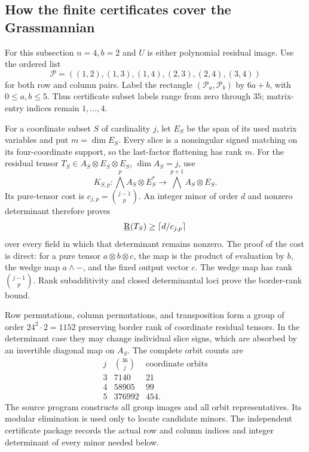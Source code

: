 
\subsection{How the finite certificates cover the Grassmannian}

For this subsection \(n=4,b=2\) and \(U\) is either polynomial
residual image. Use the ordered list
\[
 \mathcal P=((1,2),(1,3),(1,4),(2,3),(2,4),(3,4))
\]
for both row and column pairs. Label the rectangle
\((\mathcal P_a,\mathcal P_b)\) by \(6a+b\), with
\(0\leq a,b\leq5\). Thus certificate subset labels range from
zero through \(35\); matrix-entry indices remain \(1,\ldots,4\).

For a coordinate subset \(S\) of cardinality \(j\), let
\(E_S\) be the span of its used matrix variables and put
\(m= \dim E_S\). Every slice is a nonsingular signed matching
on its four-coordinate support, so the last-factor flattening
has rank \(m\). For the residual tensor
\(T_S\in A_S\otimes E_S\otimes E_S\), \(\dim A_S=j\), use
\[
 K_{S,p}:\bigwedge^p A_S\otimes E_S^*
 \longrightarrow \bigwedge^{p+1}A_S\otimes E_S.
\]
Its pure-tensor cost is \(c_{j,p}=\binom{j-1}{p}\).
An integer minor of order \(d\) and nonzero determinant
therefore proves
\[
 \underline{\mathrm R}(T_S)\geq \left\lceil d/c_{j,p}\right\rceil
\]
over every field in which that determinant remains nonzero.
The proof of the cost is direct: for a pure tensor
\(a\otimes b\otimes c\), the map is the product of evaluation
by \(b\), the wedge map \(a\wedge-\), and the fixed output
vector \(c\). The wedge map has rank \(\binom{j-1}{p}\).
Rank subadditivity and closed determinantal loci prove the
border-rank bound.

Row permutations, column permutations, and transposition form
a group of order \(24^2\cdot2=1152\) preserving border rank
of coordinate residual tensors. In the determinant case they
may change individual slice signs, which are absorbed by
an invertible diagonal map on \(A_S\).
The complete orbit counts are
\[
 \begin{array}{c|r|r}
 j&\binom{36}{j}&\text{coordinate orbits}\\ \hline
 3&7140&21\\
 4&58905&99\\
 5&376992&454.
 \end{array}
\]
The source program  constructs
all group images and all orbit representatives. Its modular
elimination is used only to locate candidate minors.
The independent certificate package
 records the actual
row and column indices and integer determinant of every
minor needed below.

